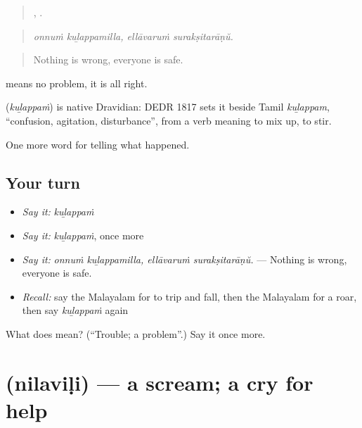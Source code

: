 \begin{quote}
 ,  .
\end{quote}

\begin{quote}
\emph{onnuṁ kuḻappamilla, ellāvaruṁ surakṣitarāṇŭ.}
\end{quote}

\begin{quote}
Nothing is wrong, everyone is safe.
\end{quote}

 means no problem, it is all right.

\begin{cousinweb}
\textbf{} (\emph{kuḻappaṁ}) is native Dravidian: DEDR 1817 sets it beside Tamil \emph{kuḻappam}, \textquotedblleft{}confusion, agitation, disturbance\textquotedblright{}, from a verb meaning to mix up, to stir.
\end{cousinweb}

\begin{grammarlens}[title={What you've built}]
One more word for telling what happened.
\end{grammarlens}

\subsection*{Your turn}
\begin{itemize}
\raggedright
  \item \emph{Say it:} \emph{kuḻappaṁ}
  \item \emph{Say it:} \emph{kuḻappaṁ}, once more
  \item \emph{Say it:} \emph{onnuṁ kuḻappamilla, ellāvaruṁ surakṣitarāṇŭ.} — Nothing is wrong, everyone is safe.
  \item \emph{Recall:} say the Malayalam for to trip and fall, then the Malayalam for a roar, then say \emph{kuḻappaṁ} again
\end{itemize}

\begin{tcolorbox}[breakable,colback=teal!4,colframe=teal!35!black,title={Before you move on}]
What does  mean? (\textquotedblleft{}Trouble; a problem\textquotedblright{}.) Say it once more.
\end{tcolorbox}
\section[\texorpdfstring{\ml{നിലവിളി} (nilaviḷi)}{നിലവിളി (nilaviḷi)}]{ (nilaviḷi) — a scream; a cry for help}

